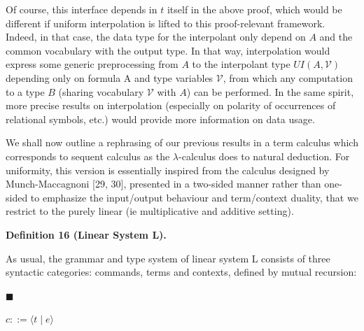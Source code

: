  
 
Of course, this interface depends in $t$ itself in the above proof, which would be different if uniform interpolation is lifted to this proof-relevant framework. Indeed, in that case, the data type for the interpolant only depend on $A$ and the common vocabulary with the output type. In that way, interpolation would express some generic preprocessing from $A$ to the interpolant type $UI(A,\mathcal{V})$ depending only on formula A and type variables $\mathcal{V}$, from which any computation to a type $B$ (sharing vocabulary $\mathcal{V}$ with $A$) can be performed. In the same spirit, more precise results on interpolation (especially on polarity of occurrences of relational symbols, etc.) would provide more information on data usage.\par
 
 
  
 
 
We shall now outline a rephrasing of our previous results in a term calculus which corresponds to sequent calculus as the $\lambda$-calculus does to natural deduction. For uniformity, this version is essentially inspired from the calculus designed by Munch-Maccagnoni [29, 30], presented in a two-sided manner rather than one-sided to emphasize the input/output behaviour and term/context duality, that we restrict to the purely linear (ie multiplicative and additive setting).\par
 
 
 
\par\medskip\noindent\textbf{Definition 16 (Linear System L).}\par
 
 
As usual, the grammar and type system of linear system L consists of three syntactic categories: commands, terms and contexts, defined by mutual recursion:\par
  
\par\noindent  $\blacksquare$ 
 
$c::=\langle t\mid e\rangle$\par
 
 
